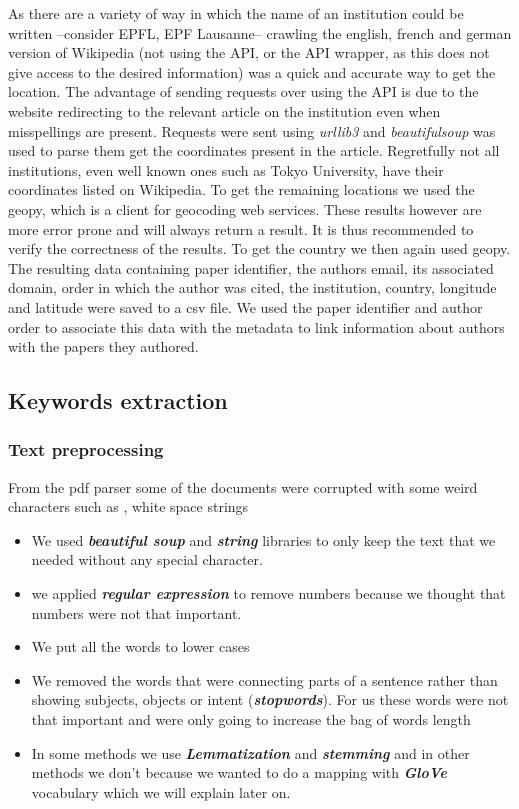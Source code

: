 \documentclass[article,twocolumn]{IEEEtran}
\begin{document}
As there are a variety of way in which the name of an institution could
be written --consider EPFL, EPF Lausanne-- crawling the english, french
and german version of Wikipedia (not using the API, or the API wrapper,
as this does not give access to the desired information) was a quick and
accurate way to get the location. The advantage of sending requests over
using the API is due to the website redirecting to the relevant article
on the institution even when misspellings are present. Requests were
sent using \emph{urllib3} and \emph{beautifulsoup} was used to parse
them get the coordinates present in the article. Regretfully not all
institutions, even well known ones such as Tokyo University, have their
coordinates listed on Wikipedia. To get the remaining locations we used
the geopy, which is a client for geocoding web services. These results
however are more error prone and will always return a result. It is thus
recommended to verify the correctness of the results. To get the country
we then again used geopy. The resulting data containing paper
identifier, the authors email, its associated domain, order in which the
author was cited, the institution, country, longitude and latitude were
saved to a csv file. We used the paper identifier and author order to
associate this data with the metadata to link information about authors
with the papers they authored.

    \hypertarget{keywords-extraction}{%
\subsection{Keywords extraction}\label{keywords-extraction}}

    \hypertarget{text-preprocessing}{%
\subsubsection{Text preprocessing}\label{text-preprocessing}}

    From the pdf parser some of the documents were corrupted with some weird
characters such as , white space strings

\begin{itemize}
\item
  We used \textbf{\emph{beautiful soup}} and \textbf{\emph{string}}
  libraries to only keep the text that we needed without any special
  character.
\item
  we applied \textbf{\emph{regular expression}} to remove numbers
  because we thought that numbers were not that important.
\item
  We put all the words to lower cases
\item
  We removed the words that were connecting parts of a sentence rather
  than showing subjects, objects or intent (\textbf{\emph{stopwords}}).
  For us these words were not that important and were only going to
  increase the bag of words length
\item
  In some methods we use \textbf{\emph{Lemmatization}} and
  \textbf{\emph{stemming}} and in other methods we don't because we
  wanted to do a mapping with \textbf{\emph{GloVe}} vocabulary which we
  will explain later on.
\end{itemize}
\end{document}
